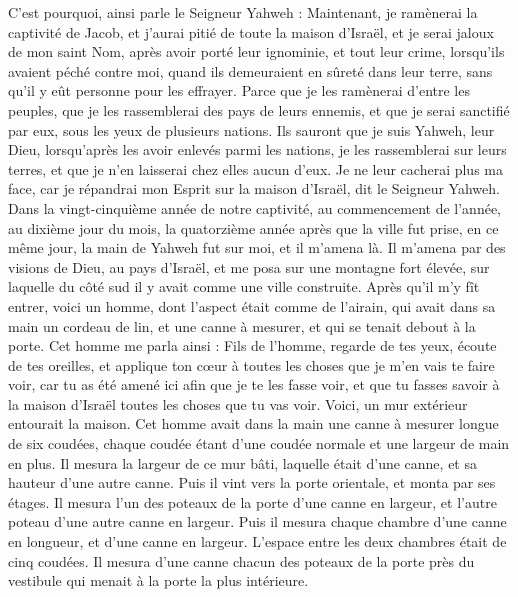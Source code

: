 \begin{multicols}{2}
C'est pourquoi, ainsi parle le Seigneur Yahweh : Maintenant, je ramènerai la captivité de Jacob, et j'aurai pitié de toute la maison d'Israël, et je serai jaloux de mon saint Nom,
après avoir porté leur ignominie, et tout leur crime, lorsqu'ils avaient péché contre moi, quand ils demeuraient en sûreté dans leur terre, sans qu'il y eût personne pour les effrayer.
Parce que je les ramènerai d'entre les peuples, que je les rassemblerai des pays de leurs ennemis, et que je serai sanctifié par eux, sous les yeux de plusieurs nations.
Ils sauront que je suis Yahweh, leur Dieu, lorsqu'après les avoir enlevés parmi les nations, je les rassemblerai sur leurs terres, et que je n'en laisserai chez elles aucun d'eux.
Je ne leur cacherai plus ma face, car je répandrai mon Esprit sur la maison d'Israël, dit le Seigneur Yahweh.
\VerseOne{}Dans la vingt-cinquième année de notre captivité, au commencement de l'année, au dixième jour du mois, la quatorzième année après que la ville fut prise, en ce même jour, la main de Yahweh fut sur moi, et il m'amena là.
Il m'amena par des visions de Dieu, au pays d'Israël, et me posa sur une montagne fort élevée, sur laquelle du côté sud il y avait comme une ville construite.
Après qu'il m'y fît entrer, voici un homme, dont l'aspect était comme de l'airain, qui avait dans sa main un cordeau de lin, et une canne à mesurer, et qui se tenait debout à la porte.
Cet homme me parla ainsi : Fils de l'homme, regarde de tes yeux, écoute de tes oreilles, et applique ton cœur à toutes les choses que je m'en vais te faire voir, car tu as été amené ici afin que je te les fasse voir, et que tu fasses savoir à la maison d'Israël toutes les choses que tu vas voir.
Voici, un mur extérieur entourait la maison. Cet homme avait dans la main une canne à mesurer longue de six coudées, chaque coudée étant d'une coudée normale et une largeur de main en plus. Il mesura la largeur de ce mur bâti, laquelle était d'une canne, et sa hauteur d'une autre canne.
Puis il vint vers la porte orientale, et monta par ses étages. Il mesura l'un des poteaux de la porte d'une canne en largeur, et l'autre poteau d'une autre canne en largeur.
Puis il mesura chaque chambre d'une canne en longueur, et d'une canne en largeur. L'espace entre les deux chambres était de cinq coudées. Il mesura d'une canne chacun des poteaux de la porte près du vestibule qui menait à la porte la plus intérieure.

\end{multicols}
